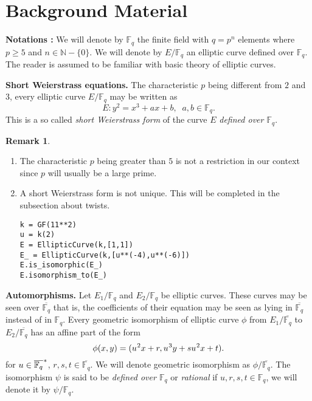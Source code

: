\documentclass[10pt]{article}
\theoremstyle{definition}
\newtheorem{remark}{Remark}
\newcommand{\N}{\mathbb{N}}
\newcommand{\F}{\mathbb{F}}
\begin{document}
\section{Background Material}

\textbf{Notations :}
We will denote by $\F_q$ the finite field with $q = p^n$ elements where $p \geq 5$ and $n \in \N - \lbrace 0 \rbrace$.
We will denote by $E/\F_q$ an elliptic curve defined over $\F_q$. 
The reader is assumed to be familiar with basic theory of elliptic curves.

\vspace*{.5cm}

\noindent \textbf{Short Weierstrass equations.} The characteristic $p$ being different from $2$ and $3$, every elliptic curve $E/\F_q$ may be written as
\[ E : y^2 = x^3 + ax + b, \; \; a,b \in \F_q. \]
This is a so called \textsl{short Weierstrass form} of the curve $E$ \textsl{defined over $\F_q$}.

\vspace*{.5cm}

\noindent \begin{remark} 
\begin{enumerate}
\item The characteristic $p$ being greater than $5$ is not a restriction in our context since $p$ will usually be a large prime.
\item A short Weierstrass form is not unique.
This will be completed in the subsection about twists.

\begin{verbatim}
k = GF(11**2)
u = k(2)
E = EllipticCurve(k,[1,1])
E_ = EllipticCurve(k,[u**(-4),u**(-6)])
E.is_isomorphic(E_)
E.isomorphism_to(E_)
\end{verbatim}
\end{enumerate}
\end{remark}

\noindent \textbf{Automorphisms.} Let $E_1/\F_q$ and $E_2/\F_q$ be elliptic curves. 
These curves may be seen over $\overline{\F_q}$ that is, the coefficients of their equation may be seen as lying in $\overline{\F_q}$ instead of in $\F_q$.
Every geometric isomorphism of elliptic curve $\phi$ from $E_1/\overline{\F_q}$ to $E_2/\overline{\F_q}$ has an  affine part of the form 
\begin{equation}\label{morphism}
 \phi(x,y) = (u^{\mkern1mu 2}x + r, u^{\mkern1mu 3}y + su^{\mkern1mu 2}x + t).
\end{equation}
for $u \in \overline{\F_q}^{\mkern1mu *}$, $r,s,t \in \overline{\F_q}$.
We will denote geometric isomorphism as $\phi/\overline{\F_q}$.
The isomorphism $\psi$ is said to be \textsl{defined over $\F_q$} or \textsl{rational} if $u,r,s,t \in \F_q$, we will denote it by $\psi/\F_q$.
\end{document}
